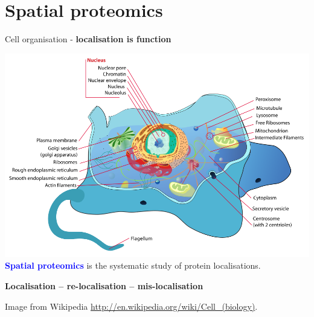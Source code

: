\documentclass{beamer}
\theoremstyle{example}
\begin{document}




\section{Spatial proteomics}


\begin{frame}{Cell organisation - \textbf{localisation is function}}
  \begin{center}
    \includegraphics[width=.8\linewidth]{figs/Animal_cell_structure.png} \\
    \textbf{\textcolor{Blue}{Spatial proteomics}} is the systematic
    study of protein localisations.
  \end{center}

  \begin{center}
    \textbf{Localisation -- re-localisation -- mis-localisation}
  \end{center}
  
  \tiny Image from Wikipedia
  \url{http://en.wikipedia.org/wiki/Cell_(biology)}.  
\end{frame}
\end{document}

